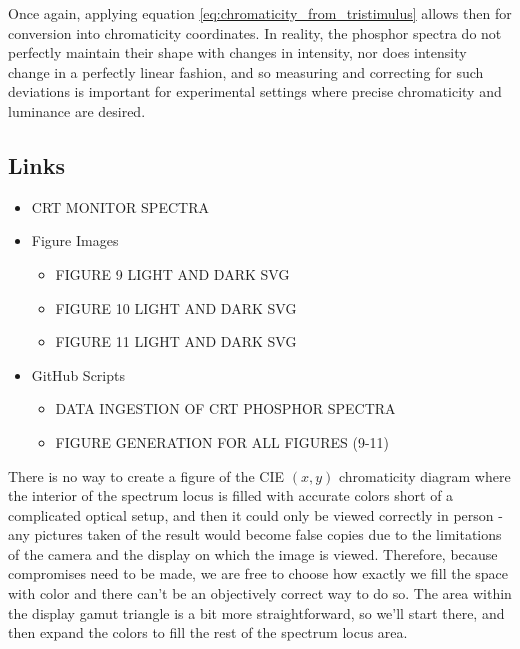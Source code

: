 \documentclass[twocolumn]{article}
\begin{document}
Once again, applying equation \ref{eq:chromaticity_from_tristimulus} allows then for conversion into chromaticity coordinates.  In reality, the phosphor spectra do not perfectly maintain their shape with changes in intensity, nor does intensity change in a perfectly linear fashion, and so measuring and correcting for such deviations is important for experimental settings where precise chromaticity and luminance are desired.
\subsection{Links}
\begin{itemize}
    \item CRT MONITOR SPECTRA
    \item Figure Images
    \begin{itemize}
        \item FIGURE 9 LIGHT AND DARK SVG
        \item FIGURE 10 LIGHT AND DARK SVG
        \item FIGURE 11 LIGHT AND DARK SVG
    \end{itemize}
    \item GitHub Scripts
    \begin{itemize}
        \item DATA INGESTION OF CRT PHOSPHOR SPECTRA
        \item FIGURE GENERATION FOR ALL FIGURES (9-11)
    \end{itemize}
\end{itemize}
There is no way to create a figure of the CIE $(x,y)$ chromaticity diagram where the interior of the spectrum locus is filled with accurate colors short of a complicated optical setup, and then it could only be viewed correctly in person - any pictures taken of the result would become false copies due to the limitations of the camera and the display on which the image is viewed.  Therefore, because compromises need to be made, we are free to choose how exactly we fill the space with color and there can’t be an objectively correct way to do so.  The area within the display gamut triangle is a bit more straightforward, so we’ll start there, and then expand the colors to fill the rest of the spectrum locus area.
\end{document}
